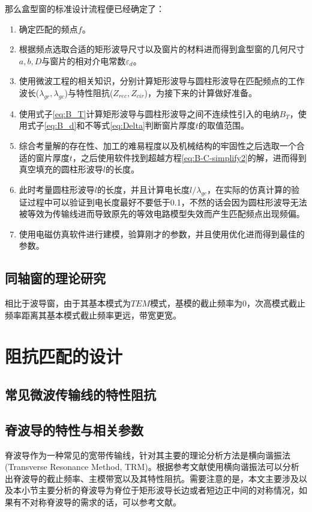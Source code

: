 \documentclass[master]{thesis-uestc}
\begin{document}
那么盒型窗的标准设计流程便已经确定了：
\begin{enumerate}
    \item 确定匹配的频点$f$。
    \item 根据频点选取合适的矩形波导尺寸以及窗片的材料进而得到盒型窗的几何尺寸$a, b, D$与窗片的相对介电常数$\varepsilon_{d}$。
    \item 使用微波工程的相关知识，分别计算矩形波导与圆柱形波导在匹配频点的工作波长($\lambda_{gr}, \lambda_{gc}$)与特性阻抗($Z_{rec}, Z_{cir}$)，为接下来的计算做好准备。
    \item 使用式子\ref{eq:B_T}计算矩形波导与圆柱形波导之间不连续性引入的电纳$B_T$，使用式子\ref{eq:B_d}和不等式\ref{eq:Delta}判断窗片厚度$t$的取值范围。
    \item 综合考量解的存在性、加工的难易程度以及机械结构的牢固性之后选取一个合适的窗片厚度$t$，之后使用软件找到超越方程\ref{eq:B-C-simplify2}的解，进而得到真空填充的圆柱形波导$l$的长度。
    \item 此时考量圆柱形波导$l$的长度，并且计算电长度$l / \lambda_{gc}$，在实际的仿真计算的验证过程中可以验证到电长度最好不要低于0.1，不然的话会因为圆柱形波导无法被等效为传输线进而导致原先的等效电路模型失效而产生匹配频点出现频偏。
    \item 使用电磁仿真软件进行建模，验算刚才的参数，并且使用优化进而得到最佳的参数。
\end{enumerate}

\subsection{同轴窗的理论研究}
相比于波导窗，由于其基本模式为$TEM$模式，基模的截止频率为0，次高模式截止频率距离其基本模式截止频率更远，带宽更宽。
\section{阻抗匹配的设计}
\subsection{常见微波传输线的特性阻抗}

\subsection{脊波导的特性与相关参数}\label{subsec:DoubleRidgeTheory}
脊波导作为一种常见的宽带传输线，针对其主要的理论分析方法是横向谐振法(Transverse Resonance Method, TRM)。根据参考文献使用横向谐振法可以分析出脊波导的截止频率、主模带宽以及其特性阻抗。需要注意的是，本文主要涉及以及本小节主要分析的脊波导为脊位于矩形波导长边或者短边正中间的对称情况，如果有不对称脊波导的需求的话，可以参考文献\cite{ramesh_asymmetri_2001}。
\end{document}
